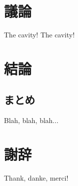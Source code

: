 \documentclass[]{jsarticle}
\begin{document}
\section{議論}
The cavity! The cavity!
\newpage
\section{結論}
\subsection{まとめ}
Blah, blah, blah...
\newpage

\section{謝辞}
Thank, danke, merci!
\newpage



\end{document}
